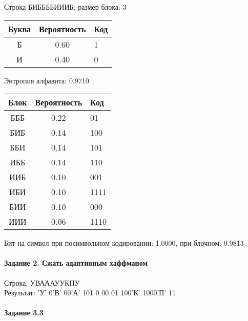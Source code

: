 \documentclass[a4paper, 12pt]{article}
\begin{document}
Строка БИББББИИИБ, размер блока: 3
\begin{center}
 \begin{tabular}{ |c|c|l| } 
  \hline
     Буква & Вероятность & Код\\ \hline
Б & 0.60 & 1\\\hline
И & 0.40 & 0
\\ \hline \end{tabular}
\end{center}
Энтропия алфавита: 0.9710
\begin{center}
 \begin{tabular}{ |c|c|l| } 
  \hline
     Блок & Вероятность & Код\\ \hline
БББ & 0.22 & 01\\\hline
БИБ & 0.14 & 100\\\hline
ББИ & 0.14 & 101\\\hline
ИББ & 0.14 & 110\\\hline
ИИБ & 0.10 & 001\\\hline
ИБИ & 0.10 & 1111\\\hline
БИИ & 0.10 & 000\\\hline
ИИИ & 0.06 & 1110
\\ \hline \end{tabular}
\end{center}
Бит на символ при посимвольном кодировании: 1.0000, при блочном: 0.9813


\pagebreak
\paragraph{Задание 2. Сжать адаптивным хаффманом\\}

Строка: 
УВАААУУКПУ\\
Результат: 'У' 0'В' 00'А' 101 0 00 01 100'К' 1000'П' 11










\pagebreak

\paragraph{Задание 3.3}
\end{document}
